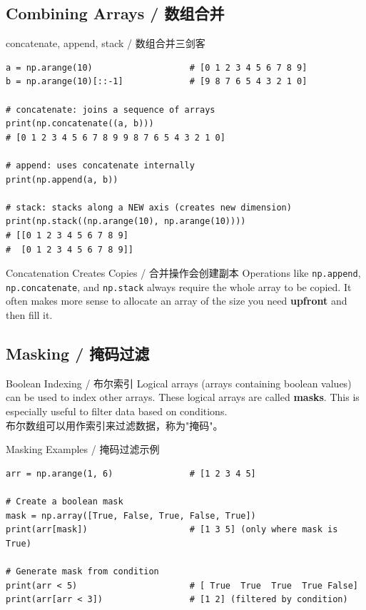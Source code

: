 \documentclass[11pt,a4paper]{report}
\let\oldtexttt\texttt
\renewcommand{\texttt}[1]{\textcolor{mainblue}{\oldtexttt{#1}}}
\begin{document}
\subsection{Combining Arrays / 数组合并}

\begin{examplebox}{concatenate, append, stack / 数组合并三剑客}
\begin{lstlisting}
a = np.arange(10)                   # [0 1 2 3 4 5 6 7 8 9]
b = np.arange(10)[::-1]             # [9 8 7 6 5 4 3 2 1 0]

# concatenate: joins a sequence of arrays
print(np.concatenate((a, b)))
# [0 1 2 3 4 5 6 7 8 9 9 8 7 6 5 4 3 2 1 0]

# append: uses concatenate internally
print(np.append(a, b))

# stack: stacks along a NEW axis (creates new dimension)
print(np.stack((np.arange(10), np.arange(10))))
# [[0 1 2 3 4 5 6 7 8 9]
#  [0 1 2 3 4 5 6 7 8 9]]
\end{lstlisting}
\end{examplebox}

\begin{warning}{Concatenation Creates Copies / 合并操作会创建副本}
    Operations like \texttt{np.append}, \texttt{np.concatenate}, and \texttt{np.stack} always require the whole array to be copied. It often makes more sense to allocate an array of the size you need \textbf{upfront} and then fill it.
\end{warning}

\subsection{Masking / 掩码过滤}

\begin{concept}{Boolean Indexing / 布尔索引}
    Logical arrays (arrays containing boolean values) can be used to index other arrays. These logical arrays are called \textbf{masks}. This is especially useful to filter data based on conditions. \\
    布尔数组可以用作索引来过滤数据，称为"掩码"。
\end{concept}

\begin{examplebox}{Masking Examples / 掩码过滤示例}
\begin{lstlisting}
arr = np.arange(1, 6)               # [1 2 3 4 5]

# Create a boolean mask
mask = np.array([True, False, True, False, True])
print(arr[mask])                    # [1 3 5] (only where mask is True)

# Generate mask from condition
print(arr < 5)                      # [ True  True  True  True False]
print(arr[arr < 3])                 # [1 2] (filtered by condition)
\end{lstlisting}
\end{examplebox}
\end{document}

